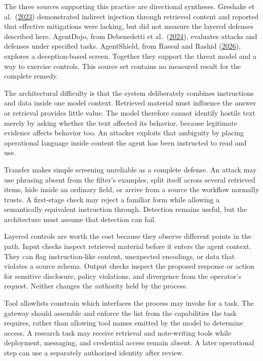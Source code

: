 The three sources supporting this practice are directional syntheses. Greshake et al.~(\href{https://arxiv.org/abs/2302.12173}{2023}) demonstrated indirect injection through retrieved content and reported that effective mitigations were lacking, but did not measure the layered defenses described here. AgentDojo, from Debenedetti et al.~(\href{https://arxiv.org/abs/2406.13352}{2024}), evaluates attacks and defenses under specified tasks. AgentShield, from Rassul and Rashid (\href{https://arxiv.org/abs/2605.11026}{2026}), explores a deception-based screen. Together they support the threat model and a way to exercise controls. This source set contains no measured result for the complete remedy.

The architectural difficulty is that the system deliberately combines instructions and data inside one model context. Retrieved material must influence the answer or retrieval provides little value. The model therefore cannot identify hostile text merely by asking whether the text affected its behavior, because legitimate evidence affects behavior too. An attacker exploits that ambiguity by placing operational language inside content the agent has been instructed to read and use.

Transfer makes simple screening unreliable as a complete defense. An attack may use phrasing absent from the filter's examples, split itself across several retrieved items, hide inside an ordinary field, or arrive from a source the workflow normally trusts. A first-stage check may reject a familiar form while allowing a semantically equivalent instruction through. Detection remains useful, but the architecture must assume that detection can fail.

Layered controls are worth the cost because they observe different points in the path. Input checks inspect retrieved material before it enters the agent context. They can flag instruction-like content, unexpected encodings, or data that violates a source schema. Output checks inspect the proposed response or action for sensitive disclosure, policy violations, and divergence from the operator's request. Neither changes the authority held by the process.

Tool allowlists constrain which interfaces the process may invoke for a task. The gateway should assemble and enforce the list from the capabilities the task requires, rather than allowing tool names emitted by the model to determine access. A research task may receive retrieval and note-writing tools while deployment, messaging, and credential access remain absent. A later operational step can use a separately authorized identity after review.

